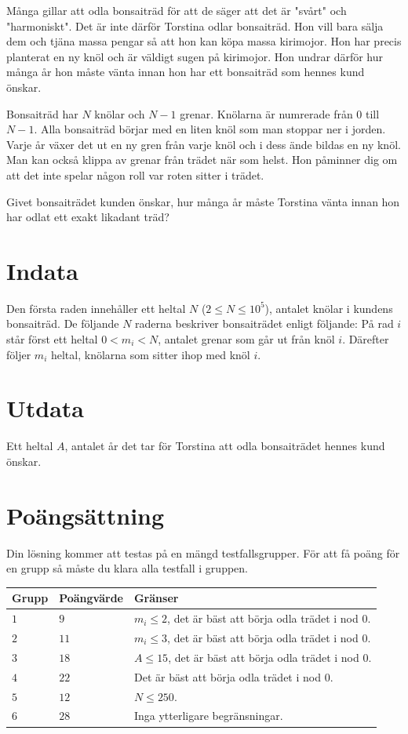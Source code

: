 Många gillar att odla bonsaiträd för att de säger att det är "svårt" och "harmoniskt". Det är inte därför Torstina odlar bonsaiträd. Hon vill bara sälja dem och tjäna massa pengar så att hon kan köpa massa kirimojor. Hon har precis planterat en ny knöl och är väldigt sugen på kirimojor. Hon undrar därför hur många år hon måste vänta innan hon har ett bonsaiträd som hennes kund önskar.

Bonsaiträd har $N$ knölar och $N-1$ grenar. Knölarna är numrerade från 0 till $N-1$. Alla bonsaiträd börjar med en liten knöl som man stoppar ner i jorden. Varje år växer det ut en ny gren från varje knöl och i dess ände bildas en ny knöl. Man kan också klippa av grenar från trädet när som helst. Hon påminner dig om att det inte spelar någon roll var roten sitter i trädet. 

Givet bonsaiträdet kunden önskar, hur många år måste Torstina vänta innan hon har odlat ett exakt likadant träd?

\section*{Indata}
Den första raden innehåller ett heltal $N$ ($2 \leq N \leq 10^5$), antalet knölar i kundens bonsaiträd.
De följande $N$ raderna beskriver bonsaiträdet enligt följande:
På rad $i$ står först ett heltal $0 < m_i < N$, antalet grenar som går ut från knöl $i$. Därefter följer $m_i$ heltal, knölarna som sitter ihop med knöl $i$. 

\section*{Utdata}
Ett heltal $A$, antalet år det tar för Torstina att odla bonsaiträdet hennes kund önskar.

\section*{Poängsättning}
Din lösning kommer att testas på en mängd testfallsgrupper.
För att få poäng för en grupp så måste du klara alla testfall i gruppen.

\noindent
\begin{tabular}{| l | l | p{12cm} |}
  \hline
  Grupp & Poängvärde & Gränser \\ \hline
  $1$   & $9$        & $m_i\leq 2$, det är bäst att börja odla trädet i nod 0. \\ \hline
  $2$   & $11$       & $m_i \leq 3$, det är bäst att börja odla trädet i nod 0. \\ \hline
  $3$   & $18$       & $A \leq 15$, det är bäst att börja odla trädet i nod 0. \\ \hline
  $4$   & $22$       & Det är bäst att börja odla trädet i nod 0. \\ \hline
  $5$   & $12$       & $N \leq 250$. \\ \hline
  $6$   & $28$       & Inga ytterligare begränsningar. \\ \hline
\end{tabular}



